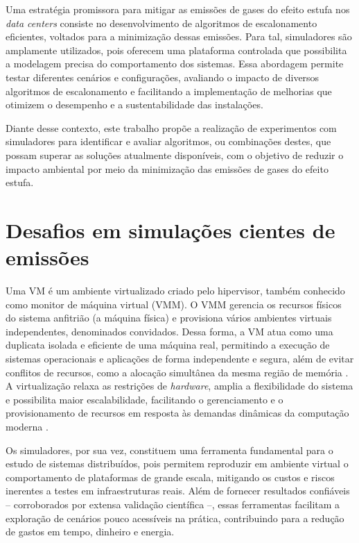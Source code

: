 \documentclass[12pt]{article}
\begin{document}
Uma estratégia promissora para mitigar as emissões de gases do efeito estufa nos \textit{data centers} consiste no desenvolvimento de algoritmos de escalonamento eficientes, voltados para a minimização dessas emissões. Para tal, simuladores são amplamente utilizados, pois oferecem uma plataforma controlada que possibilita a modelagem precisa do comportamento dos sistemas. Essa abordagem permite testar diferentes cenários e configurações, avaliando o impacto de diversos algoritmos de escalonamento e facilitando a implementação de melhorias que otimizem o desempenho e a sustentabilidade das instalações.

Diante desse contexto, este trabalho propõe a realização de experimentos com simuladores para identificar e avaliar algoritmos, ou combinações destes, que possam superar as soluções atualmente disponíveis, com o objetivo de reduzir o impacto ambiental por meio da minimização das emissões de gases do efeito estufa.

\section{Desafios em simulações cientes de emissões} \label{sec:firstpage}

Uma VM é um ambiente virtualizado criado pelo hipervisor, também conhecido como monitor de máquina virtual (VMM). O VMM gerencia os recursos físicos do sistema anfitrião (a máquina física) e provisiona vários ambientes virtuais independentes, denominados convidados. Dessa forma, a VM atua como uma duplicata isolada e eficiente de uma máquina real, permitindo a execução de sistemas operacionais e aplicações de forma independente e segura, além de evitar conflitos de recursos, como a alocação simultânea da mesma região de memória \cite{popek:74}. A virtualização relaxa as restrições de \textit{hardware}, amplia a flexibilidade do sistema e possibilita maior escalabilidade, facilitando o gerenciamento e o provisionamento de recursos em resposta às demandas dinâmicas da computação moderna \cite{buyya:13}.

Os simuladores, por sua vez, constituem uma ferramenta fundamental para o estudo de sistemas distribuídos, pois permitem reproduzir em ambiente virtual o comportamento de plataformas de grande escala, mitigando os custos e riscos inerentes a testes em infraestruturas reais. Além de fornecer resultados confiáveis -- corroborados por extensa validação científica --, essas ferramentas facilitam a exploração de cenários pouco acessíveis na prática, contribuindo para a redução de gastos em tempo, dinheiro e energia.
\end{document}
